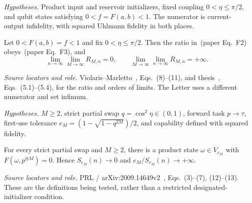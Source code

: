 \documentclass[11pt]{article}
\begin{document}
\par\medskip
\noindent\begin{minipage}{\linewidth}
\emph{Hypotheses.} Product input and reservoir initializers, fixed coupling $0<\eta\le\pi/2$, and qubit states satisfying $0<f=F(a,b)<1$. The numerator is current-output infidelity, with squared Uhlmann fidelity in both places.

\begin{theorem}
Let $0<F(a,b)=f<1$ and fix $0<\eta\le\pi/2$. Then the ratio in~(paper Eq.~F2) obeys~(paper Eq.~F3), and
\begin{equation}
 \lim_{n\to\infty}\lim_{M\to\infty}R_{M,n}=0,
 \qquad
 \lim_{M\to\infty}\lim_{n\to\infty}R_{M,n}=+\infty.
\end{equation}
\end{theorem}

\noindent\emph{Source locators and role.} Violaris--Marletto~\cite{vm}, Eqs.~(8)--(11), and thesis~\cite{thesis}, Eqs.~(5.1)--(5.4), for the ratio and orders of limits. The Letter uses a different numerator and set infimum.
\end{minipage}
\par

\par\medskip
\noindent\begin{minipage}{\linewidth}
\emph{Hypotheses.} $M\ge2$, strict partial swap $q=\cos^2\eta\in(0,1)$, forward task $p\to\tau$, first-use tolerance $e_M=(1-\sqrt{1-q^{2M}})/2$, and capability defined with squared fidelity.

\begin{proposition}
For every strict partial swap and $M\ge2$, there is a product state $\omega\in V_{e_M}$ with $F(\omega,p^{\otimes M})=0$. Hence $S_{e_M}(n)\to0$ and $e_M/S_{e_M}(n)\to+\infty$.
\end{proposition}

\noindent\emph{Source locators and role.} PRL / arXiv:2009.14649v2~\cite{prl}, Eqs.~(3)--(7), (12)--(13). These are the definitions being tested, rather than a restricted designated-initializer condition.
\end{minipage}
\par
\end{document}
